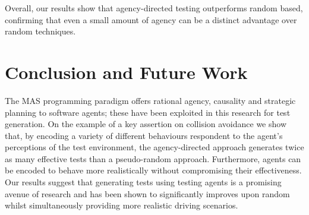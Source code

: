 \documentclass[letterpaper, 10 pt, journal, twoside]{IEEEtran}
\begin{document}


Overall, our results show that agency-directed testing outperforms random based, confirming that even a small amount of agency can be a distinct advantage over random techniques. 
%


\section{Conclusion and Future Work}\label{s:conclusion}
The MAS programming paradigm offers rational agency, causality and strategic planning to software agents; these have been exploited in this research for test generation. 
%
On the example of a key assertion on collision avoidance we show that, by encoding a variety of different behaviours respondent to the agent's perceptions of the test environment, the agency-directed approach generates twice as many effective tests than a pseudo-random approach. Furthermore, agents can be encoded to behave more realistically without compromising their effectiveness. 
Our results suggest that generating tests using testing agents is a promising avenue of research and has been shown to significantly improves upon random whilst simultaneously providing more realistic driving scenarios.
\end{document}
